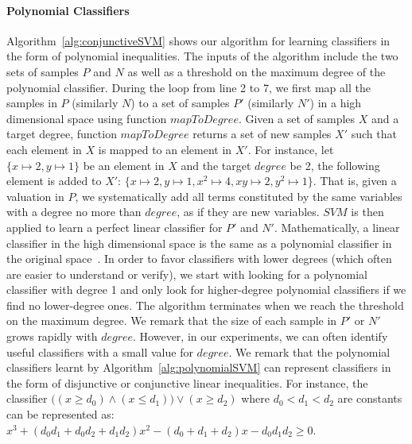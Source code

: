 \paragraph{Polynomial Classifiers} Algorithm~\ref{alg:conjunctiveSVM} shows our algorithm for learning classifiers in the form of polynomial inequalities.
The inputs of the algorithm include the two sets of samples $P$ and $N$ as well as a threshold on the maximum degree of the polynomial classifier.
During the loop from line 2 to 7, we first map all the samples in $P$ (similarly $N$) to a set of samples $P'$ (similarly $N'$) in a high dimensional space using function $\mathit{mapToDegree}$.
Given a set of samples $X$ and a target degree, function $\mathit{mapToDegree}$ returns a set of new samples $X'$ such that each element in $X$ is mapped to an element in $X'$.
For instance, let $\{x \mapsto 2, y \mapsto 1\}$ be an element in $X$ and the target $\mathit{degree}$ be 2, the following element is added to $X'$: $\{x \mapsto 2, y \mapsto 1, x^2 \mapsto 4, xy \mapsto 2, y^2 \mapsto 1\}$.
That is, given a valuation in $P$, we systematically add all terms constituted by the same variables with a degree no more than $\mathit{degree}$, as if they are new variables.
$\mathit{SVM}$ is then applied to learn a perfect linear classifier for $P'$ and $N'$. %
Mathematically, a linear classifier in the high dimensional space is the same as a polynomial classifier in the original space~\cite{svm:kernel}.
In order to favor classifiers with lower degrees (which often are easier to understand or verify), we start with looking for a polynomial classifier with degree 1 and only look for higher-degree polynomial classifiers if we find no lower-degree ones.
The algorithm terminates when we reach the threshold on the maximum degree.
We remark that the size of each sample in $P'$ or $N'$ grows rapidly with $\mathit{degree}$. 
However, in our experiments, we can often identify useful classifiers with a small value for $\mathit{degree}$.
We remark that the polynomial classifiers learnt by Algorithm~\ref{alg:polynomialSVM} can represent classifiers in the form of disjunctive or conjunctive linear inequalities.
For instance, the classifier $\big((x \ge d_0) \wedge (x \le d_1)\big) \vee (x \ge d_2)$
where $\mathit{d_0 < d_1 < d_2}$ are constants can be represented as: $\mathit{x^3 + (d_0d_1 + d_0d_2 + d_1d_2)x^2 - (d_0 + d_1 + d_2)x - d_0d_1d_2 \geq 0}$.


